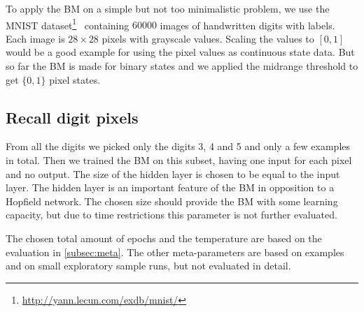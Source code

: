\documentclass[12pt,twoside]{article}
\theoremstyle{plain}
\theoremstyle{definition}
\theoremstyle{remark}
\begin{document}
To apply the BM on a simple but not too minimalistic problem, we use the MNIST dataset\footnote{\url{http://yann.lecun.com/exdb/mnist/}}~\cite{MNIST} containing $60000$ images of handwritten digits with labels. Each image is $28 \times 28$ pixels with grayscale values. Scaling the values to $[0,1]$ would be a good example for using the pixel values as continuous state data. But so far the BM is made for binary states and we applied the midrange threshold to get $\{0, 1\}$ pixel states.


\subsection{Recall digit pixels}
\label{subsec:recall}

From all the digits we picked only the digits 3, 4 and 5 and only a few examples in total. Then we trained the BM on this subset, having one input for each pixel and no output.
The size of the hidden layer is chosen to be equal to the input layer. The hidden layer is an important feature of the BM in opposition to a Hopfield network. The chosen size should provide the BM with some learning capacity, but due to time restrictions this parameter is not further evaluated.

The chosen total amount of epochs and the temperature are based on the evaluation in \cref{subsec:meta}. The other meta-parameters are based on examples~\cite{BMImpl} and on small exploratory sample runs, but not evaluated in detail.
\end{document}
